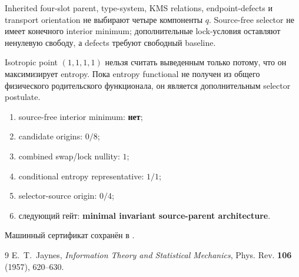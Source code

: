 \begin{theorem}
Inherited four-slot parent, type-system, KMS relations, endpoint-defects и
transport orientation не выбирают четыре компоненты $q$. Source-free
selector не имеет конечного interior minimum; дополнительные lock-условия
оставляют ненулевую свободу, а defects требуют свободный baseline.
\end{theorem}

\begin{nogocriterion}
Isotropic point $(1,1,1,1)$ нельзя считать выведенным только потому, что он
максимизирует entropy. Пока entropy functional не получен из общего
физического родительского функционала, он является дополнительным selector postulate.
\end{nogocriterion}

\begin{protocol}\begin{enumerate}
\item source-free interior minimum: \textbf{нет};
\item candidate origins: \textbf{$0/8$};
\item combined swap/lock nullity: \textbf{$1$};
\item conditional entropy representative: \textbf{$1/1$};
\item selector-source origin: \textbf{$0/4$};
\item следующий гейт: \textbf{minimal invariant source-parent architecture}.
\end{enumerate}\end{protocol}

Машинный сертификат сохранён в
.

\begin{thebibliography}{9}
E.~T.~Jaynes, \emph{Information Theory and Statistical Mechanics},
Phys. Rev. \textbf{106} (1957), 620--630.
\end{thebibliography}